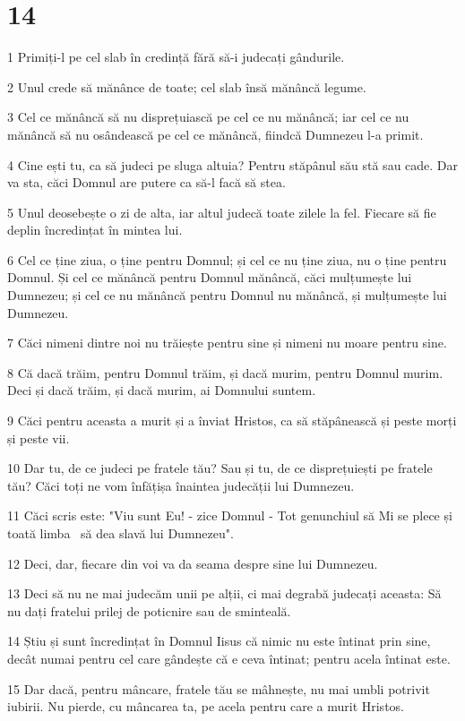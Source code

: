 \chapter{14}

\par 1 Primiți-l pe cel slab în credință fără să-i judecați gândurile.
\par 2 Unul crede să mănânce de toate; cel slab însă mănâncă legume.
\par 3 Cel ce mănâncă să nu disprețuiască pe cel ce nu mănâncă; iar cel ce nu mănâncă să nu osândească pe cel ce mănâncă, fiindcă Dumnezeu l-a primit.
\par 4 Cine ești tu, ca să judeci pe sluga altuia? Pentru stăpânul său stă sau cade. Dar va sta, căci Domnul are putere ca să-l facă să stea.
\par 5 Unul deosebește o zi de alta, iar altul judecă toate zilele la fel. Fiecare să fie deplin încredințat în mintea lui.
\par 6 Cel ce ține ziua, o ține pentru Domnul; și cel ce nu ține ziua, nu o ține pentru Domnul. Și cel ce mănâncă pentru Domnul mănâncă, căci mulțumește lui Dumnezeu; și cel ce nu mănâncă pentru Domnul nu mănâncă, și mulțumește lui Dumnezeu.
\par 7 Căci nimeni dintre noi nu trăiește pentru sine și nimeni nu moare pentru sine.
\par 8 Că dacă trăim, pentru Domnul trăim, și dacă murim, pentru Domnul murim. Deci și dacă trăim, și dacă murim, ai Domnului suntem.
\par 9 Căci pentru aceasta a murit și a înviat Hristos, ca să stăpânească și peste morți și peste vii.
\par 10 Dar tu, de ce judeci pe fratele tău? Sau și tu, de ce disprețuiești pe fratele tău? Căci toți ne vom înfățișa înaintea judecății lui Dumnezeu.
\par 11 Căci scris este: "Viu sunt Eu! - zice Domnul - Tot genunchiul să Mi se plece și toată limba  să dea slavă lui Dumnezeu".
\par 12 Deci, dar, fiecare din voi va da seama despre sine lui Dumnezeu.
\par 13 Deci să nu ne mai judecăm unii pe alții, ci mai degrabă judecați aceasta: Să nu dați fratelui prilej de poticnire sau de sminteală.
\par 14 Știu și sunt încredințat în Domnul Iisus că nimic nu este întinat prin sine, decât numai pentru cel care gândește că e ceva întinat; pentru acela întinat este.
\par 15 Dar dacă, pentru mâncare, fratele tău se mâhnește, nu mai umbli potrivit iubirii. Nu pierde, cu mâncarea ta, pe acela pentru care a murit Hristos.
